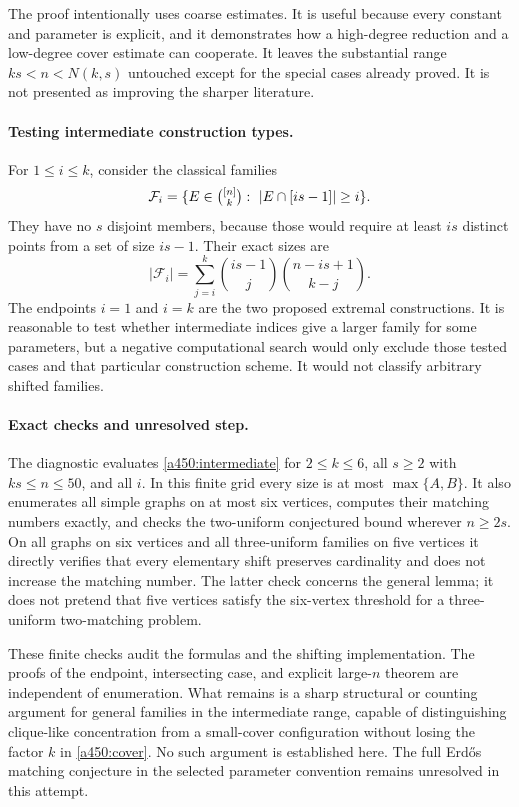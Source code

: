 \documentclass[11pt]{article}
\begin{document}
The proof intentionally uses coarse estimates. It is useful because every constant and parameter is explicit, and it demonstrates how a high-degree reduction and a low-degree cover estimate can cooperate. It leaves the substantial range $ks<n<N(k,s)$ untouched except for the special cases already proved. It is not presented as improving the sharper literature.

\paragraph{Testing intermediate construction types.}
For $1\leq i\leq k$, consider the classical families
\[
           \mathcal F_i=\{E\in\tbinom{[n]}k:\ |E\cap[is-1]|\geq i\}.
\]
They have no $s$ disjoint members, because those would require at least $is$ distinct points from a set of size $is-1$. Their exact sizes are
\begin{equation}\label{a450:intermediate}
             |\mathcal F_i|=\sum_{j=i}^k
                     \binom{is-1}{j}\binom{n-is+1}{k-j}.
\end{equation}
The endpoints $i=1$ and $i=k$ are the two proposed extremal constructions. It is reasonable to test whether intermediate indices give a larger family for some parameters, but a negative computational search would only exclude those tested cases and that particular construction scheme. It would not classify arbitrary shifted families.

\paragraph{Exact checks and unresolved step.}
The diagnostic evaluates \eqref{a450:intermediate} for $2\leq k\leq6$, all $s\geq2$ with $ks\leq n\leq50$, and all $i$. In this finite grid every size is at most $\max\{A,B\}$. It also enumerates all simple graphs on at most six vertices, computes their matching numbers exactly, and checks the two-uniform conjectured bound wherever $n\geq2s$. On all graphs on six vertices and all three-uniform families on five vertices it directly verifies that every elementary shift preserves cardinality and does not increase the matching number. The latter check concerns the general lemma; it does not pretend that five vertices satisfy the six-vertex threshold for a three-uniform two-matching problem.

These finite checks audit the formulas and the shifting implementation. The proofs of the endpoint, intersecting case, and explicit large-$n$ theorem are independent of enumeration. What remains is a sharp structural or counting argument for general families in the intermediate range, capable of distinguishing clique-like concentration from a small-cover configuration without losing the factor $k$ in \eqref{a450:cover}. No such argument is established here. The full Erd\H{o}s matching conjecture in the selected parameter convention remains unresolved in this attempt.
\end{document}
